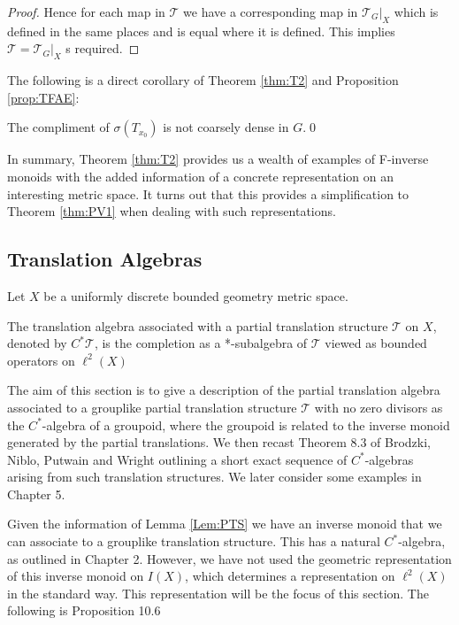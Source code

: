 \begin{corollary}
\begin{proof}
Hence for each map in $\mathcal{T}$ we have a corresponding map in $\mathcal{T}_{G}|_{X}$ which is defined in the same places and is equal where it is defined. This implies $\mathcal{T}=\mathcal{T}_{G}|_{X}$ s required.
\end{proof}

The following is a direct corollary of Theorem \ref{thm:T2} and Proposition \ref{prop:TFAE}:

\begin{corollary}
The compliment of $\sigma (T_{x_{0}})$ is not coarsely dense in $G$.\qed
\end{corollary}

In summary, Theorem \ref{thm:T2} provides us a wealth of examples of F-inverse monoids with the added information of a concrete representation on an interesting metric space. It turns out that this provides a simplification to Theorem \ref{thm:PV1} when dealing with such representations.

\subsection{Translation Algebras}
Let $X$ be a uniformly discrete bounded geometry metric space.

\begin{definition}
The translation algebra associated with a partial translation structure $\mathcal{T}$ on $X$, denoted by $C^{*}\mathcal{T}$, is the completion as a *-subalgebra of $\mathcal{T}$ viewed as bounded operators on $\ell^{2}(X)$
\end{definition}

The aim of this section is to give a description of the partial translation algebra associated to a grouplike partial translation structure $\mathcal{T}$ with no zero divisors as the $C^{*}$-algebra of a groupoid, where the groupoid is related to the inverse monoid generated by the partial translations. We then recast Theorem 8.3 of Brodzki, Niblo, Putwain and Wright \cite{rosiesthesis} outlining a short exact sequence of $C^{*}$-algebras arising from such translation structures. We later consider some examples in Chapter 5.

Given the information of Lemma \ref{Lem:PTS} we have an inverse monoid that we can associate to a grouplike translation structure. This has a natural $C^{*}$-algebra, as outlined in Chapter 2. However, we have not used the geometric representation of this inverse monoid on $I(X)$, which determines a representation on $\ell^{2}(X)$ in the standard way. This representation will be the focus of this section. The following is Proposition 10.6 \cite{MR2419901}


\end{corollary}

